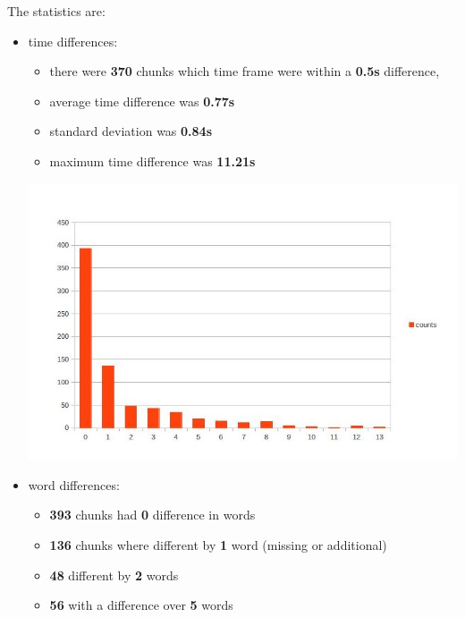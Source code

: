 \documentclass[12pt,a4paper,english]{article}
\begin{document}
The statistics are:
\begin{itemize}
    \item time differences: \newline
    \begin{itemize}
        \item there were \textbf{370} chunks which time frame were within a \textbf{0.5s} difference, 
        \item average time difference was \textbf{0.77s}
        \item standard deviation was \textbf{0.84s}
        \item maximum time difference was \textbf{11.21s}
    \end{itemize}
    \begin{center}
        \includegraphics[scale=0.6]{length_based_results_better.jpg}
    \end {center}
    \item word differences:
    \begin{itemize}
        \item \textbf{393} chunks had \textbf{0} difference in words
        \item \textbf{136} chunks where different by \textbf{1} word (missing or additional)
        \item \textbf{48} different by \textbf{2} words
        \item \textbf{56} with a difference over \textbf{5} words
    \end{itemize}
\end{itemize}
\end{document}
